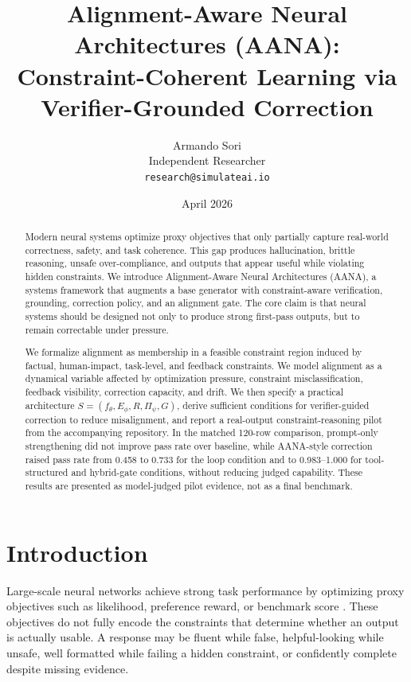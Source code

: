 \documentclass[11pt]{article}
\title{\textbf{Alignment-Aware Neural Architectures (AANA):}\\
\large Constraint-Coherent Learning via Verifier-Grounded Correction}
\author{Armando Sori\\Independent Researcher\\\texttt{research@simulateai.io}}
\date{April 2026}
\begin{document}
\maketitle

\begin{abstract}
Modern neural systems optimize proxy objectives that only partially capture real-world correctness, safety, and task coherence. This gap produces hallucination, brittle reasoning, unsafe over-compliance, and outputs that appear useful while violating hidden constraints. We introduce Alignment-Aware Neural Architectures (AANA), a systems framework that augments a base generator with constraint-aware verification, grounding, correction policy, and an alignment gate. The core claim is that neural systems should be designed not only to produce strong first-pass outputs, but to remain correctable under pressure.

We formalize alignment as membership in a feasible constraint region induced by factual, human-impact, task-level, and feedback constraints. We model alignment as a dynamical variable affected by optimization pressure, constraint misclassification, feedback visibility, correction capacity, and drift. We then specify a practical architecture \(S=(f_\theta,E_\phi,R,\Pi_\psi,G)\), derive sufficient conditions for verifier-guided correction to reduce misalignment, and report a real-output constraint-reasoning pilot from the accompanying repository. In the matched 120-row comparison, prompt-only strengthening did not improve pass rate over baseline, while AANA-style correction raised pass rate from 0.458 to 0.733 for the loop condition and to 0.983--1.000 for tool-structured and hybrid-gate conditions, without reducing judged capability. These results are presented as model-judged pilot evidence, not as a final benchmark.
\end{abstract}

\section{Introduction}

Large-scale neural networks achieve strong task performance by optimizing proxy objectives such as likelihood, preference reward, or benchmark score \cite{brown2020language,ouyang2022training}. These objectives do not fully encode the constraints that determine whether an output is actually usable. A response may be fluent while false, helpful-looking while unsafe, well formatted while failing a hidden constraint, or confidently complete despite missing evidence.
\end{document}
